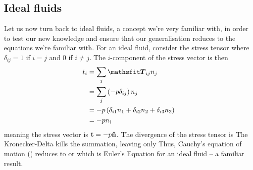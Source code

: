 \documentclass[12pt]{book}
\begin{document}
\subsection{Ideal fluids}
Let us now turn back to ideal fluids, a concept we're very familiar with, in order to test our new knowledge and ensure that our generalisation reduces to the equations we're familiar with.  For an ideal fluid, consider the stress tensor
where $\delta_{ij} = 1$ if $i=j$ and 0 if $i\ne j$.  The $i$-component of the stress vector is then
\begin{align*}
t_i &= \sum_j \tensor{T}_{ij}n_j \\
& = \sum_j \left(-p\delta_{ij}\right)n_j \\
& = -p \left(\delta_{i1}n_1 + \delta_{i2}n_2 + \delta_{i3}n_3\right) \\
& = -pn_i
\end{align*}
meaning the stress vector is $\mathbf{t} = -p\boldsymbol{\hat{\textbf{n}}}$. The divergence of the stress tensor is
The Kronecker-Delta kills the summation, leaving only
Thus, Cauchy's equation of motion () reduces to
or
which is Euler's Equation for an ideal fluid -- a familiar result.
\end{document}
